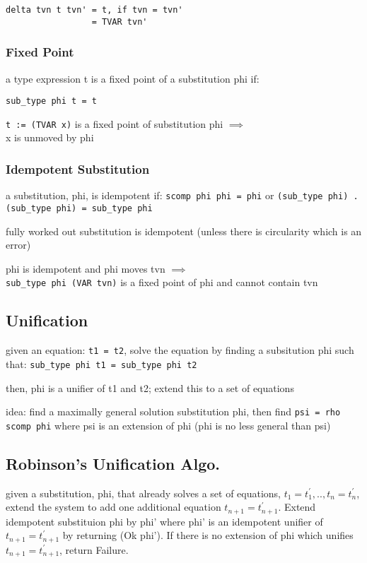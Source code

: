\documentclass[8pt]{extarticle}
\begin{document}
\begin{multicols*}{2}
\begin{verbatim}
delta tvn t tvn' = t, if tvn = tvn'
                 = TVAR tvn'
\end{verbatim}

\subsubsection{Fixed Point}

a type expression t is a fixed point of a substitution phi if:
\begin{verbatim}
sub_type phi t = t
\end{verbatim}

\verb|t := (TVAR x)| is a fixed point of substitution phi $\implies$\\
x is unmoved by phi

\subsubsection{Idempotent Substitution}
a substitution, phi, is idempotent if:
\verb|scomp phi phi = phi| or 
\verb|(sub_type phi) . (sub_type phi) = sub_type phi|

fully worked out substitution is idempotent (unless there is circularity which is an error)

phi is idempotent and phi moves tvn $\implies$\\
\verb|sub_type phi (VAR tvn)| is a fixed point of phi and cannot contain tvn

\subsection{Unification}

given an equation: \verb|t1 = t2|, solve the equation by finding a subsitution phi such that: \verb|sub_type phi t1 = sub_type phi t2|

then, phi is a unifier of t1 and t2; extend this to a set of equations

idea: find a maximally general solution substitution phi, then find \verb|psi = rho scomp phi| where psi is an extension of phi (phi is no less general than psi)

\vfill\null
\columnbreak

\subsection{Robinson's Unification Algo.}
given a substitution, phi, that already solves a set of equations, $t_1=t_1^{\prime}, .., t_n=t_n^{\prime}$, extend the system to add one additional equation $t_{n+1}=t_{n+1}^{\prime}$. Extend idempotent substituion phi by phi' where phi' is an idempotent unifier of $t_{n+1}=t_{n+1}^{\prime}$ by returning (Ok phi'). If there is no extension of phi which unifies $t_{n+1}=t_{n+1}^{\prime}$, return Failure.


\end{multicols*}
\end{document}
